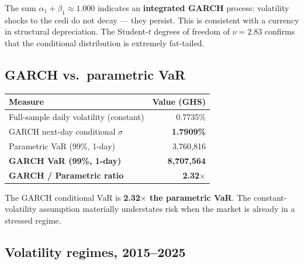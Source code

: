 \documentclass[11pt,a4paper]{article}
\begin{document}
\noindent The sum $\alpha_1 + \beta_1 \approx 1.000$ indicates an
\textbf{integrated GARCH} process: volatility shocks to the cedi do not
decay --- they persist. This is consistent with a currency in structural
depreciation. The Student-\(t\) degrees of freedom of $\nu = 2.83$ confirms
that the conditional distribution is extremely fat-tailed.

\subsection{GARCH vs.\ parametric VaR}

\begin{table}[h!]
\centering
\renewcommand{\arraystretch}{1.3}
\begin{tabular}{L{6cm} r}
\toprule
\textbf{Measure} & \textbf{Value (GHS)} \\
\midrule
Full-sample daily volatility (constant) & 0.7735\% \\
GARCH next-day conditional $\sigma$     & \textbf{1.7909\%} \\
\midrule
Parametric VaR (99\%, 1-day)            & 3{,}760{,}816 \\
\textbf{GARCH VaR (99\%, 1-day)}        & \textbf{8{,}707{,}564} \\
\midrule
\textbf{GARCH / Parametric ratio}       & \textbf{2.32\(\times\)} \\
\bottomrule
\end{tabular}
\end{table}

\noindent The GARCH conditional VaR is \textbf{2.32\(\times\) the
parametric VaR}. The constant-volatility assumption materially understates
risk when the market is already in a stressed regime.

\subsection{Volatility regimes, 2015--2025}
\end{document}
